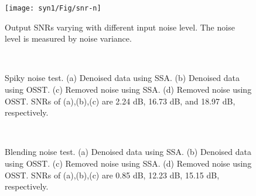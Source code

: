 \begin{figure}[htb!]
  \centering
  \texttt{[image: syn1/Fig/snr-n]}        
   \caption{Output SNRs varying with different input noise level. The noise level is measured by noise variance.}
   \label{fig:snr-n}
\end{figure}

\begin{figure}[htb!]
  \centering
   \\
   \caption{Spiky noise test. (a) Denoised data using SSA. (b) Denoised data using OSST. (c) Removed noise using SSA. (d) Removed noise using OSST. SNRs of (a),(b),(c) are 2.24 dB, 16.73 dB, and 18.97 dB, respectively.}
   \label{fig:syn1-sp-dn}
\end{figure}

\begin{figure}[htb!]
  \centering
   \\
   \caption{Blending noise test. (a) Denoised data using SSA. (b) Denoised data using OSST. (c) Removed noise using SSA. (d) Removed noise using OSST. SNRs of (a),(b),(c) are 0.85 dB, 12.23 dB, 15.15 dB, respectively.}
   \label{fig:syn1-bd-dn}
\end{figure}

